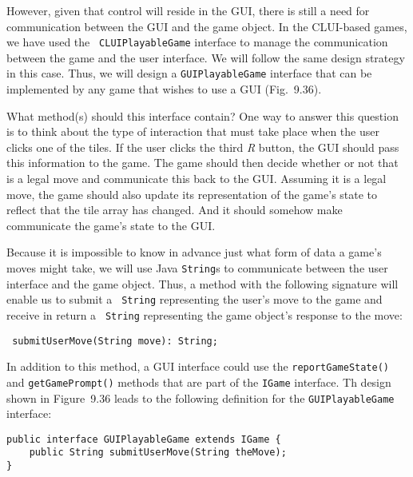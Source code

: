 However, given that control will reside in the GUI, there is still a
need for communication between the GUI and the game
object. In the CLUI-based games, we have used the {\tt
CLUIPlayableGame} interface to manage the communication between the
game and the user interface.  We will follow the same design strategy
in this case.  Thus, we will design a {\tt GUIPlayableGame} interface that
can be implemented by any game that wishes to use a GUI (Fig.~9.36).

What method(s) should this interface contain?  One way to answer this
question is to think about the type of interaction that must take
place when the user clicks  one of the tiles.  If the user clicks
the third {\em R} button, the GUI should pass this information to the
game. The game should then decide whether or not that is a legal move
and communicate this back to the GUI. Assuming it is a legal move, the
game should also update its representation of the game's state to
reflect that the tile array has changed. And it should somehow make
communicate the game's state to the GUI.

Because it is impossible to know in advance just what form of data a
game's moves might take, we will use Java {\tt String}s to communicate
between the user interface and the game object. Thus, a method with
the following signature will enable us to submit a {\tt
String} representing the user's move to the game  and receive in return a {\tt
String} representing the game object's response to the move:

\begin{jjjlisting}
\begin{lstlisting}
 submitUserMove(String move): String;
\end{lstlisting}
\end{jjjlisting}

\noindent In addition to this method, a GUI interface could use the
{\tt report\-Game\-State()} and {\tt get\-Game\-Prompt()} methods that are
part of the {\tt IGame} interface.  Th design shown in Figure~9.36
leads to the following definition for the {\tt GUIPlayableGame}
interface:

\begin{jjjlisting}
\begin{lstlisting}
public interface GUIPlayableGame extends IGame {
    public String submitUserMove(String theMove);
}
\end{lstlisting}
\end{jjjlisting}


